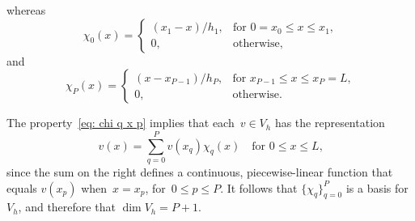 whereas
\[
\chi_0(x)=\begin{cases}
	(x_1-x)/h_1,&\text{for $0=x_0\le x\le x_1$,}\\
	0,&\text{otherwise,}
\end{cases}
\]
and 
\[
\chi_P(x)=\begin{cases}
	(x-x_{P-1})/h_P,&\text{for $x_{P-1}\le x\le x_P=L$,}\\
	0,&\text{otherwise.}
\end{cases}
\]

The property~\eqref{eq: chi q x p} implies that each~$v\in V_h$ has the 
representation
\[
v(x)=\sum_{q=0}^P v(x_q)\chi_q(x)\quad\text{for $0\le x\le L$,}
\]
since the sum on the right defines a continuous, piecewise-linear function that 
equals $v(x_p)$ when~$x=x_p$, for~$0\le p\le P$.  It follows that 
$\{\chi_q\}_{q=0}^P$ is a basis for~$V_h$, and therefore that $\dim V_h=P+1$.

